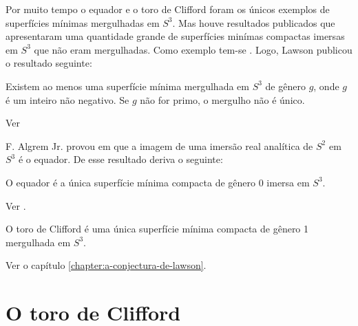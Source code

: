 
Por muito tempo o equador e o toro de Clifford foram os únicos exemplos de superfícies mínimas mergulhadas em $S^3$. Mas houve resultados publicados que apresentaram uma quantidade grande de superfícies minímas compactas imersas em $S^3$ que não eram mergulhadas. Como exemplo tem-se \cite{Lawson1969}. Logo, Lawson publicou o resultado seguinte:

\begin{teorema}[Lawson]
	Existem ao menos uma superfície mínima mergulhada em $S^3$ de gênero $g$, onde $g$ é um inteiro não negativo. Se $g$ não for primo, o mergulho não é único.
\end{teorema}

\begin{demonstracao}
	Ver \cite[Theorem 2]{Lawson1970}
\end{demonstracao}



F. Algrem Jr. provou em \cite{Almgren1966} que a imagem de uma imersão real analítica de $S^2$ em $S^3$ é o equador. De esse resultado deriva o seguinte:

\begin{teorema}[Almgren]
	O equador é a única superfície mínima compacta de gênero 0 imersa em $S^3$.
\end{teorema}

\begin{demonstracao}
	Ver \cite[Lemma 1]{Almgren1966}.
\end{demonstracao}

\begin{teorema}
	O toro de Clifford é uma única superfície mínima compacta de gênero 1 mergulhada  em $S^3$.
\end{teorema}

\begin{demonstracao}
	Ver o capítulo \ref{chapter:a-conjectura-de-lawson}.
\end{demonstracao}

\section{O toro de Clifford}

